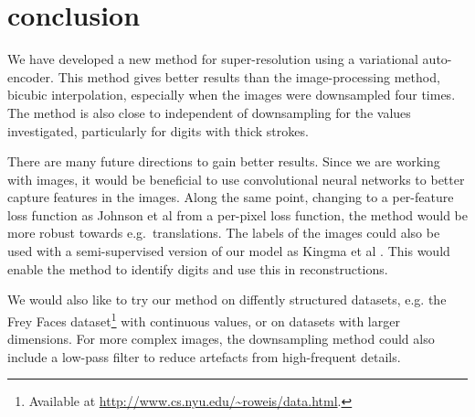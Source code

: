 \section{conclusion}
\label{sec:conclusion}

We have developed a new method for super-resolution using a variational auto-encoder.
This method gives better results than the image-processing method, bicubic interpolation, especially when the images were downsampled four times.
The method is also close to independent of downsampling for the values investigated, particularly for digits with thick strokes.

There are many future directions to gain better results.
Since we are working with images, it would be beneficial to use convolutional neural networks to better capture features in the images.
Along the same point, changing to a per-feature loss function as Johnson et al \cite{Johnson16} from a per-pixel loss function, the method would be more robust towards e.g.\ translations.
The labels of the images could also be used with a semi-supervised version of our model as Kingma et al \cite{Kingma2014}. This would enable the method to identify digits and use this in reconstructions.

We would also like to try our method on diffently structured datasets, e.g. the Frey Faces dataset\footnote{Available at \url{http://www.cs.nyu.edu/~roweis/data.html}.} with continuous values, or on datasets with larger dimensions.
For more complex images, the downsampling method could also include a low-pass filter to reduce artefacts from high-frequent details.
